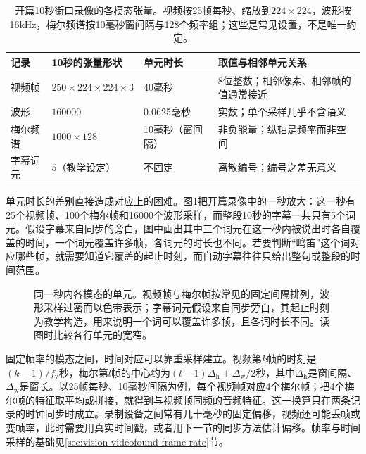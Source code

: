 \begin{table}[htbp]
  \centering
  \small
  \begin{tabularx}{\linewidth}{@{}p{18mm}p{30mm}p{26mm}X@{}}
    \toprule
    记录 & 10秒的张量形状 & 单元时长 & 取值与相邻单元关系\\
    \midrule
    视频帧 & $250\times224\times224\times3$ & 40毫秒 & 8位整数；相邻像素、相邻帧的值通常接近\\
    波形 & $160000$ & 0.0625毫秒 & 实数；单个采样几乎不含语义\\
    梅尔频谱 & $1000\times128$ & 10毫秒（窗间隔） & 非负能量；纵轴是频率而非空间\\
    字幕词元 & $5$（教学设定） & 不固定 & 离散编号；编号之差无意义\\
    \bottomrule
  \end{tabularx}
  \caption{开篇10秒街口录像的各模态张量。视频按25帧每秒、缩放到$224\times224$，波形按16kHz，梅尔频谱按10毫秒窗间隔与128个频率组；这些是常见设置，不是唯一约定。}
  \label{tab:vision-alignment-shapes}
\end{table}

单元时长的差别直接造成对应上的困难。图\ref{fig:vision-alignment-time-resolution}把开篇录像中的一秒放大：这一秒有25个视频帧、100个梅尔帧和16000个波形采样，而整段10秒的字幕一共只有5个词元。假设字幕来自同步的旁白，图中画出其中三个词元在这一秒内被说出时各自覆盖的时间，一个词元覆盖许多帧，各词元的时长也不同。若要判断“鸣笛”这个词对应哪些帧，就需要知道它覆盖的起止时刻，而自动字幕往往只给出整句或整段的时间范围。

\begin{figure}[tbp]
  \centering
  
  \caption{同一秒内各模态的单元。视频帧与梅尔帧按常见的固定间隔排列，波形采样过密而以色带表示；字幕词元假设来自同步旁白，其起止时刻为教学构造，用来说明一个词可以覆盖许多帧，且各词时长不同。读图时比较各行单元的宽窄。}
  \label{fig:vision-alignment-time-resolution}
\end{figure}

固定帧率的模态之间，时间对应可以靠重采样建立。视频第$k$帧的时刻是$(k-1)/f_{\mathrm v}$秒，梅尔第$l$帧的中心约为$(l-1)\Delta_{\mathrm h}+\Delta_{\mathrm w}/2$秒，其中$\Delta_{\mathrm h}$是窗间隔、$\Delta_{\mathrm w}$是窗长。以25帧每秒、10毫秒间隔为例，每个视频帧对应4个梅尔帧；把4个梅尔帧的特征取平均或拼接，就得到与视频帧同频的音频特征。这一换算只在两条记录的时钟同步时成立。录制设备之间常有几十毫秒的固定偏移，视频还可能丢帧或变帧率，此时需要用真实时间戳，或者用下一节的同步方法估计偏移。帧率与时间采样的基础见\ref{sec:vision-videofound-frame-rate}节。

